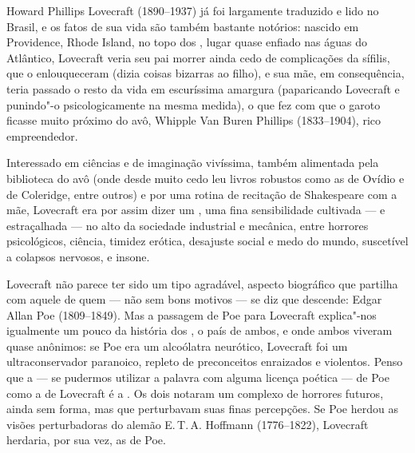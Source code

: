 \pagebreak

\vspace*{1.5cm}


\bigskip

\hfill{}

\bigskip
\bigskip
\bigskip

\begin{multicols}{2}
Howard Phillips Lovecraft (1890--1937) já foi largamente traduzido e lido
no Brasil, e os fatos de sua vida são também bastante notórios: nascido
em Providence, Rhode Island, no topo dos , lugar quase enfiado nas
águas do Atlântico, Lovecraft veria seu pai morrer ainda cedo de
complicações da sífilis, que o enlouqueceram (dizia coisas bizarras ao
filho), e sua mãe, em consequência, teria passado o resto da vida em
escuríssima amargura (paparicando Lovecraft e punindo"-o psicologicamente
na mesma medida), o que fez com que o garoto ficasse muito próximo do
avô, Whipple Van Buren Phillips (1833--1904), rico empreendedor.

Interessado em ciências e de imaginação vivíssima, também alimentada
pela biblioteca do avô (onde desde muito cedo leu livros robustos como
as {} de Ovídio e {} de
Coleridge, entre outros) e por uma rotina de recitação de Shakespeare
com a mãe, Lovecraft era por assim dizer um {},
uma fina sensibilidade cultivada --- e estraçalhada --- no alto da
sociedade industrial e mecânica, entre horrores psicológicos, ciência,
timidez erótica, desajuste social e medo do mundo, suscetível a colapsos
nervosos, e insone.

Lovecraft não parece ter sido um tipo agradável, aspecto biográfico que
partilha com aquele de quem --- não sem bons motivos --- se diz que
descende: Edgar Allan Poe (1809--1849). Mas a passagem de Poe para
Lovecraft explica"-nos igualmente um pouco da história dos , o país de
ambos, e onde ambos viveram quase anônimos: se Poe era um alcoólatra
neurótico, Lovecraft foi um ultraconservador paranoico, repleto de
preconceitos enraizados e violentos. Penso que a {} --- se
pudermos utilizar a palavra com alguma licença poética --- de Poe como a
de Lovecraft é a {}. Os dois notaram um complexo
de horrores futuros, ainda sem forma, mas que perturbavam suas finas
percepções. Se Poe herdou as visões perturbadoras do alemão E.\,T.\,A.
Hoffmann (1776--1822), Lovecraft herdaria, por sua
vez, as de Poe.


\end{multicols}
